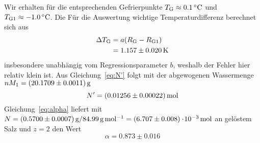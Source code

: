 Wir erhalten für die entsprechenden Gefrierpunkte $T_\mathrm{G} \approx \unit[0.1]{ ^\circ C}$ und $T_\mathrm{G1} \approx \unit[-1.0]{ ^\circ C}$. Die Für die Auswertung wichtige Temperaturdifferenz berechnet sich aus
\begin{align}
    \Delta T_\mathrm{G} &= a (R_\mathrm{G} - R_\mathrm{G1}) \label{eq:DT} \\
                        &= \unit[1.157 \pm 0.020]{K} \notag
\end{align} 
insbesondere unabhängig vom Regressionsparameter $b$, weshalb der Fehler hier relativ klein ist.
%
Aus Gleichung~\ref{eq:N'} folgt mit der abgewogenen Wassermenge $n M_1 = \unit[(20.1709 \pm 0.0011)]{g}$
\[
    N' = \unit[(0.01256 \pm 0.00022)]{mol}
\]
%
Gleichung~\ref{eq:alpha} liefert mit $N = \unit[(0.5700 \pm 0.0007)]{g} / \unit[84.99]{g\,mol^{-1}} = \unit[(6.707 \pm 0.008)\cdot\!10^{-3}]{mol}$ an gelöstem Salz und $z = 2$ den Wert 
\[
    \alpha = 0.873 \pm 0.016
\]














